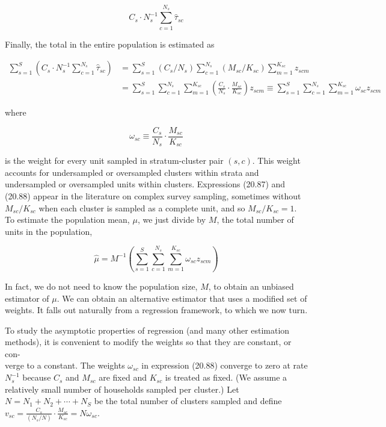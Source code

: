 \documentclass[10pt]{article}
\begin{document}
\begin{equation*}
C_{s} \cdot N_{s}^{-1} \sum_{c=1}^{N_{s}} \hat{\tau}_{s c} \tag{20.86}
\end{equation*}


Finally, the total in the entire population is estimated as


\begin{align*}
\sum_{s=1}^{S}\left(C_{s} \cdot N_{s}^{-1} \sum_{c=1}^{N_{s}} \hat{\tau}_{s c}\right) & =\sum_{s=1}^{S}\left(C_{s} / N_{s}\right) \sum_{c=1}^{N_{s}}\left(M_{s c} / K_{s c}\right) \sum_{m=1}^{K_{s c}} z_{s c m} \\
& =\sum_{s=1}^{S} \sum_{c=1}^{N_{s}} \sum_{m=1}^{K_{s c}}\left(\frac{C_{s}}{N_{s}} \cdot \frac{M_{s c}}{K_{s c}}\right) z_{s c m} \equiv \sum_{s=1}^{S} \sum_{c=1}^{N_{s}} \sum_{m=1}^{K_{s c}} \omega_{s c} z_{s c m} \tag{20.87}
\end{align*}


where


\begin{equation*}
\omega_{s c} \equiv \frac{C_{s}}{N_{s}} \cdot \frac{M_{s c}}{K_{s c}} \tag{20.88}
\end{equation*}


is the weight for every unit sampled in stratum-cluster pair $(s, c)$. This weight accounts for undersampled or oversampled clusters within strata and undersampled or oversampled units within clusters. Expressions (20.87) and (20.88) appear in the literature on complex survey sampling, sometimes without $M_{s c} / K_{s c}$ when each cluster is sampled as a complete unit, and so $M_{s c} / K_{s c}=1$. To estimate the population mean, $\mu$, we just divide by $M$, the total number of units in the population,


\begin{equation*}
\hat{\mu}=M^{-1}\left(\sum_{s=1}^{S} \sum_{c=1}^{N_{s}} \sum_{m=1}^{K_{s c}} \omega_{s c} z_{s c m}\right) \tag{20.89}
\end{equation*}


In fact, we do not need to know the population size, $M$, to obtain an unbiased estimator of $\mu$. We can obtain an alternative estimator that uses a modified set of weights. It falls out naturally from a regression framework, to which we now turn.

To study the asymptotic properties of regression (and many other estimation methods), it is convenient to modify the weights so that they are constant, or con-\\
verge to a constant. The weights $\omega_{s c}$ in expression (20.88) converge to zero at rate $N_{s}^{-1}$ because $C_{s}$ and $M_{s c}$ are fixed and $K_{s c}$ is treated as fixed. (We assume a relatively small number of households sampled per cluster.) Let $N=N_{1}+N_{2}+\cdots+N_{S}$ be the total number of clusters sampled and define\\
$v_{s c}=\frac{C_{s}}{\left(N_{s} / N\right)} \cdot \frac{M_{s c}}{K_{s c}}=N \omega_{s c}$.
\end{document}
